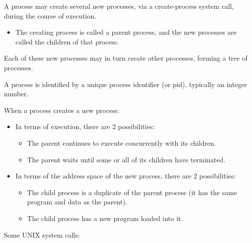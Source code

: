     \par A process may create several new processes, via a create-process system call, during the course of execution.
    \begin{itemize}
      \item The creating process is called a parent process, and the new processes are called the children of that process.
    \end{itemize}
    \par Each of these new processes may in turn create other processes, forming a tree of processes.
    \par A process is identified by a unique process identifier (or pid), typically an integer number.
    \par When a process creates a new process:
    \begin{itemize}
      \item In terms of execution, there are 2 possibilities:
        \begin{itemize}
          \item The parent continues to execute concurrently with its children.
          \item The parent waits until some or all of its children have terminated.
        \end{itemize}
        \item In terms of the address space of the new process, there are 2 possibilities:
          \begin{itemize}
            \item The child process is a duplicate of the parent process (it has the same
      program and data as the parent).
            \item The child process has a new program loaded into it.
          \end{itemize}
    \end{itemize}
    \par Some UNIX system calls:
